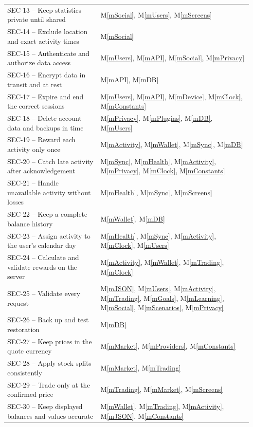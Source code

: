 \documentclass[12pt, titlepage]{article}
\newcommand{\mref}[1]{M\ref{#1}}
\begin{document}
\begin{longtable}{@{}p{}p{}@{}}
SEC-13 -- Keep statistics private until shared & \mref{mSocial}, \mref{mUsers}, \mref{mScreens}\\ %
SEC-14 -- Exclude location and exact activity times & \mref{mSocial}\\ %
SEC-15 -- Authenticate and authorize data access & \mref{mUsers}, \mref{mAPI}, \mref{mSocial}, \mref{mPrivacy}\\ %
SEC-16 -- Encrypt data in transit and at rest & \mref{mAPI}, \mref{mDB}\\ %
SEC-17 -- Expire and end the correct sessions & \mref{mUsers}, \mref{mAPI}, \mref{mDevice}, \mref{mClock}, \mref{mConstants}\\ %
SEC-18 -- Delete account data and backups in time & \mref{mPrivacy}, \mref{mPlugins}, \mref{mDB}, \mref{mUsers}\\ %
SEC-19 -- Reward each activity only once & \mref{mActivity}, \mref{mWallet}, \mref{mSync}, \mref{mDB}\\ %
SEC-20 -- Catch late activity after acknowledgement & \mref{mSync}, \mref{mHealth}, \mref{mActivity}, \mref{mPrivacy}, \mref{mClock}, \mref{mConstants}\\ %
SEC-21 -- Handle unavailable activity without losses & \mref{mHealth}, \mref{mSync}, \mref{mScreens}\\ %
SEC-22 -- Keep a complete balance history & \mref{mWallet}, \mref{mDB}\\ %
SEC-23 -- Assign activity to the user's calendar day & \mref{mHealth}, \mref{mSync}, \mref{mActivity}, \mref{mClock}, \mref{mUsers}\\ %
SEC-24 -- Calculate and validate rewards on the server & \mref{mActivity}, \mref{mWallet}, \mref{mTrading}, \mref{mClock}\\ %
SEC-25 -- Validate every request & \mref{mJSON}, \mref{mUsers}, \mref{mActivity}, \mref{mTrading}, \mref{mGoals}, \mref{mLearning}, \mref{mSocial}, \mref{mScenarios}, \mref{mPrivacy}\\ %
SEC-26 -- Back up and test restoration & \mref{mDB}\\ %
SEC-27 -- Keep prices in the quote currency & \mref{mMarket}, \mref{mProviders}, \mref{mConstants}\\ %
SEC-28 -- Apply stock splits consistently & \mref{mMarket}, \mref{mTrading}\\ %
SEC-29 -- Trade only at the confirmed price & \mref{mTrading}, \mref{mMarket}, \mref{mScreens}\\ %
SEC-30 -- Keep displayed balances and values accurate & \mref{mWallet}, \mref{mTrading}, \mref{mActivity}, \mref{mJSON}, \mref{mConstants}\\ %

\end{longtable}
\end{document}
